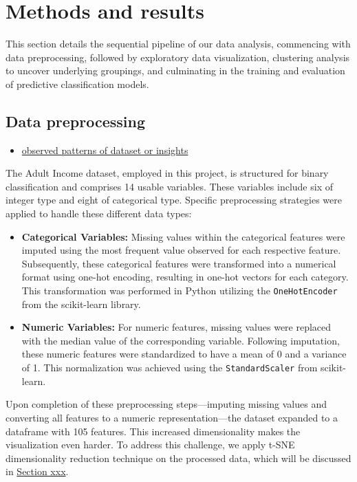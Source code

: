 \documentclass{article}
\begin{document}
\section{Methods and results}

This section details the sequential pipeline of our data analysis, commencing with data preprocessing, followed by exploratory data visualization, clustering analysis to uncover underlying groupings, and culminating in the training and evaluation of predictive classification models.

\subsection{Data preprocessing}

\begin{itemize}
    \item \underline{observed patterns of dataset or insights}
\end{itemize}

The Adult Income dataset, employed in this project, is structured for binary classification and comprises 14 usable variables. These variables include six of integer type and eight of categorical type. Specific preprocessing strategies were applied to handle these different data types:

\begin{itemize}
    \item \textbf{Categorical Variables:} Missing values within the categorical features were imputed using the most frequent value observed for each respective feature. Subsequently, these categorical features were transformed into a numerical format using one-hot encoding, resulting in one-hot vectors for each category. This transformation was performed in Python utilizing the \texttt{OneHotEncoder} from the scikit-learn library.
    \item \textbf{Numeric Variables:} For numeric features, missing values were replaced with the median value of the corresponding variable. Following imputation, these numeric features were standardized to have a mean of 0 and a variance of 1. This normalization was achieved using the \texttt{StandardScaler} from scikit-learn.
\end{itemize}

Upon completion of these preprocessing steps—imputing missing values and converting all features to a numeric representation—the dataset expanded to a dataframe with 105 features. This increased dimensionality makes the visualization even harder. To address this challenge, we apply t-SNE dimensionality reduction technique on the processed data, which will be discussed in \underline{Section xxx}.
\end{document}

